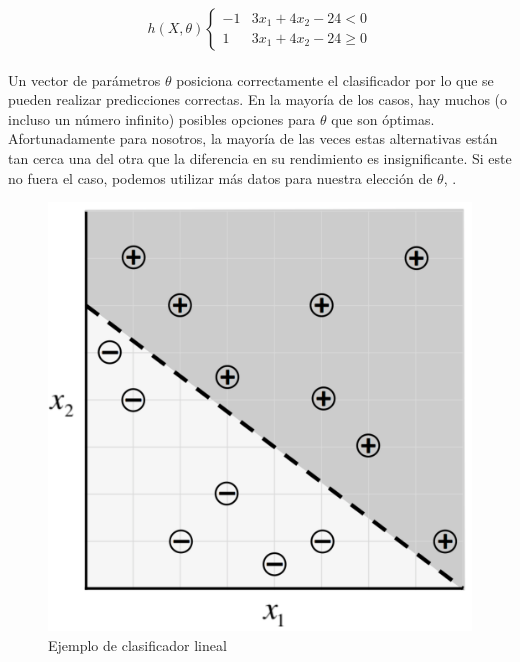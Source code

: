     \begin{equation}
        h(X,\theta)\begin{cases}-1 & 3x_1+ 4x_2-24< 0\\
        1 &  3x_1+ 4x_2-24 \geq 0\end{cases}
    \end{equation}
    \\
    Un vector de parámetros $\theta$ posiciona correctamente el clasificador por lo que se pueden realizar predicciones correctas. En la mayoría de los casos, hay muchos (o incluso un número infinito) posibles opciones para $\theta$ que son óptimas. Afortunadamente para nosotros, la mayoría de las veces estas alternativas están tan cerca una del otra que la diferencia en su rendimiento es insignificante. Si este no fuera el caso, podemos utilizar más datos para nuestra elección de $\theta$, \cite{dlBook}.
    \begin{figure}[htp]
        \centering
        \includegraphics[scale=0.23]{chapter3/sampleData.png}
        \caption{Ejemplo de clasificador lineal}
        \label{fig:sdata}
    \end{figure}




